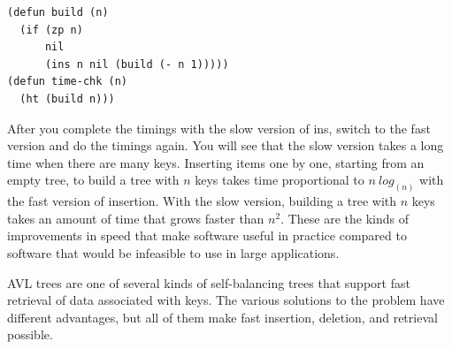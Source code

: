 \begin{center}
\begin{code}
\begin{verbatim}
(defun build (n)
  (if (zp n)
      nil
      (ins n nil (build (- n 1)))))
(defun time-chk (n)
  (ht (build n)))
\end{verbatim}
\end{code}
\end{center}

After you complete the timings with the slow version of \textsf{ins},
switch to the fast version and do the timings again.
You will see that the slow version takes a long time
when there are many keys.
Inserting items one by one, starting from an empty tree,
to build a tree with $n$ keys takes time proportional to $n~log_(n)$
with the fast version of insertion.
With the slow version,
building a tree with $n$ keys takes an amount of time
that grows faster than $n^2$.
These are the kinds of improvements in speed that
make software useful in practice compared to software
that would be infeasible to use in large applications.

AVL trees are one of several kinds of self-balancing
trees that support fast retrieval of data associated with keys.
The various solutions to the problem have different advantages,
but all of them make fast insertion, deletion, and retrieval possible.

